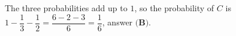 The three probabilities add up to $1$, so the probability of $C$ is $1-\dfrac13-\dfrac12=\dfrac{6-2-3}{6}=\boxed{\dfrac16}$, answer $\textbf{(B)}$.

